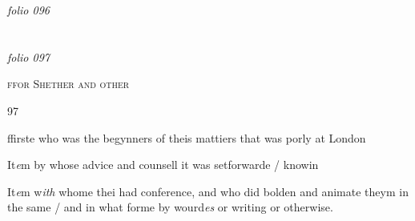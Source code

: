 \documentclass[12pt, a4paper]{book}
\begin{document}
\textit{folio 096}


         \vspace*{4cm}
         
\dotfill
						  \section*{}  \subsection*{}

\textit{folio 097}


		
				\begin{center} \begin{large} {\scshape ffor Shether and other} \end{large} \end{center}
			
\begin{flushright}{\color{Mahogany}97}\end{flushright}
            		
				
				\marginpar[\vspace{0.5cm}{\textcolor{Gray}{1}}]{}
			
				
		\ifthenelse{\isodd{\thepage}}
		{\reversemarginpar}
		{\normalmarginpar}
		 ffirste who was the begynners of theis mattiers that was porly at London
            		

            		
            			
				\marginpar[\vspace{0.5cm}{\textcolor{Gray}{2}}]{}
			
            			
		\ifthenelse{\isodd{\thepage}}
		{\reversemarginpar}
		{\normalmarginpar}
		 It\textit{e}m by whose advice and counsell it was setforwarde / knowin
            		

            		
            			
				\marginpar[\vspace{0.5cm}{\textcolor{Gray}{3}}]{}
			
            			
		\ifthenelse{\isodd{\thepage}}
		{\reversemarginpar}
		{\normalmarginpar}
		 It\textit{e}m w\textit{ith} whome thei had conference, and who did
 bolden and animate theym in the same / and in what
 forme by wourd\textit{es} or writing or otherwise.
            		
\end{document}
